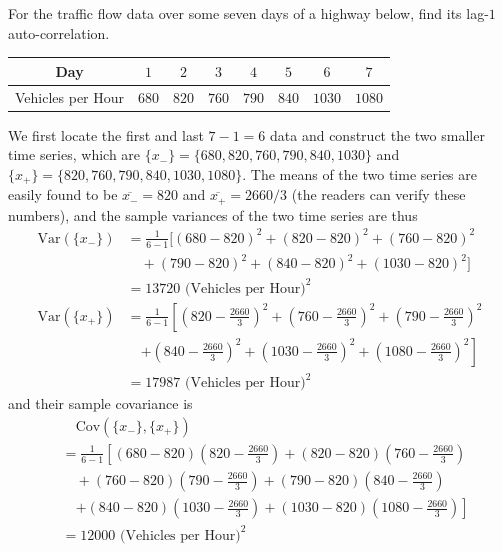 \begin{exmp}
For the traffic flow data over some seven days of a highway below, find its lag-$1$ auto-correlation.
\begin{center}
\begin{tabular}{|c|c|c|c|c|c|c|c|}
\hline
Day & $1$ & $2$ & $3$ & $4$ & $5$ & $6$ & $7$ \\
\hline
Vehicles per Hour & $680$ & $820$ & $760$ & $790$ & $840$ & $1030$ & $1080$ \\
\hline
\end{tabular}
\end{center}
\end{exmp}
We first locate the first and last $7-1 = 6$ data and construct the two smaller time series, which are $\{x_-\} = \{680, 820, 760, 790, 840, 1030\}$ and $\{x_+\} = \{820, 760, 790, 840, 1030, 1080\}$. The means of the two time series are easily found to be $\overline{x_{-}} = 820$ and $\overline{x_{+}} = 2660/3$ (the readers can verify these numbers), and the sample variances of the two time series are thus
\begin{align*}
\text{Var}(\{x_-\}) &= \frac{1}{6-1}[(680 - 820)^2 + (820 - 820)^2 + (760 - 820)^2 \\
& \quad + (790 - 820)^2 + (840 - 820)^2 + (1030 - 820)^2] \\
&=13720 \text{ (Vehicles per Hour)}^2 \\
\text{Var}(\{x_+\}) &= \frac{1}{6-1}\left[\left(820 - \frac{2660}{3}\right)^2 + \left(760 - \frac{2660}{3}\right)^2 + \left(790 - \frac{2660}{3}\right)^2\right. \\
&\quad \left. + \left(840 - \frac{2660}{3}\right)^2 + \left(1030 - \frac{2660}{3}\right)^2 + \left(1080 - \frac{2660}{3}\right)^2\right] \\
&= 17987 \text{ (Vehicles per Hour)}^2
\end{align*}
and their sample covariance is
\begin{align*}
&\quad \text{Cov}(\{x_{-}\},\{x_{+}\}) \\
&= \frac{1}{6-1}\left[(680 - 820)\left(820 - \frac{2660}{3}\right) + (820 - 820)\left(760 - \frac{2660}{3}\right)\right. \\
&\quad + (760 - 820)\left(790 - \frac{2660}{3}\right)  + (790 - 820)\left(840 - \frac{2660}{3}\right) \\
&\quad \left. + (840 - 820)\left(1030 - \frac{2660}{3}\right) + (1030 - 820)\left(1080 - \frac{2660}{3}\right)\right] \\
&= 12000 \text{ (Vehicles per Hour)}^2
\end{align*}
